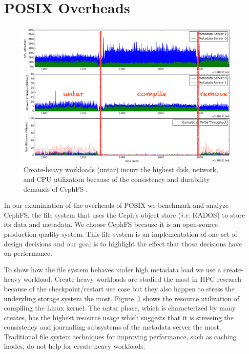 \section{POSIX Overheads}
\label{sec:posix-overheads}

\begin{figure}[tb]
\centering
\includegraphics[width=1\linewidth]{./graphs/overhead-creates.png}
\caption{Create-heavy workloads (untar) incurr the highest disk, network, and
CPU utilization because of the consistency and durability demands of CephFS
.}\label{fig:overhead-creates}
\end{figure}

In our examiniation of the overheads of POSIX we benchmark and analyze CephFS,
the file system that uses the Ceph's object store ({\it i.e.} RADOS) to store
its data and metadata. We choose CephFS because it is an open-source production
quality system. This file system is an implementation of one set of design
decisions and our goal is to highlight the effect that those decisions have on
performance.

To show how the file system behaves under high metadata load we use a
create-heavy workload. Create-heavy workloads are studied the most in HPC
research because of the checkpoint/restart use case but they also happen to
stress the underyling storage system the most.
Figure~\ref{fig:overhead-creates} shows the resource utilization of compiling
the Linux kernel.  The untar phase, which is characterized by many creates, has
the highest resource usage which suggests that it is stressing the consistency
and journalling subsystems of the metadata server the most. Traditional file
system techniques for improving performance, such as caching inodes, do not
help for create-heavy workloads.

